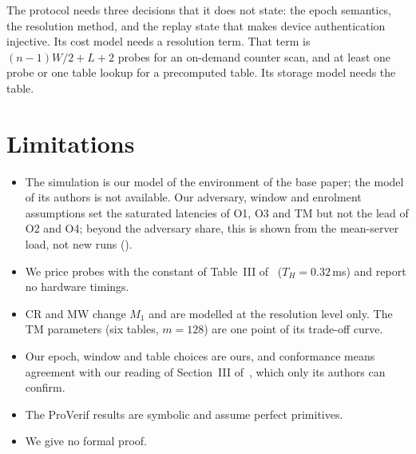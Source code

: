 \ifshortpaper\else
{} The protocol needs three decisions that it does not state: the epoch
semantics, the resolution method, and the replay state that makes device authentication injective. Its cost model
needs a resolution term. That term is $(n-1)W/2+L+2$ probes for an on-demand counter scan, and at least one probe or
one table lookup for a precomputed table. Its storage model needs the table.
\fi

\section{Limitations}\label{sec:lim}
\begin{itemize}
\item The simulation is our model of the environment of the base paper; the model of its authors is not available. Our
adversary, window and enrolment assumptions set the saturated latencies of O1, O3 and TM but not the lead of O2 and O4;
beyond the adversary share, this is shown from the mean-server load, not new runs ().
\item We price probes with the constant of Table~III of~\cite{base} ($T_H=0.32$\,ms) and report no hardware timings.
\item CR and MW change $M_1$ and are modelled at the resolution level only. The TM parameters (six tables, $m=128$) are
one point of its trade-off curve.
\item Our epoch, window and table choices are ours, and conformance means agreement with our reading of Section~III
of~\cite{base}, which only its authors can confirm.
\iffv
\item The ProVerif results are symbolic and assume perfect primitives.
\else
\item We give no formal proof.
\fi
\end{itemize}

